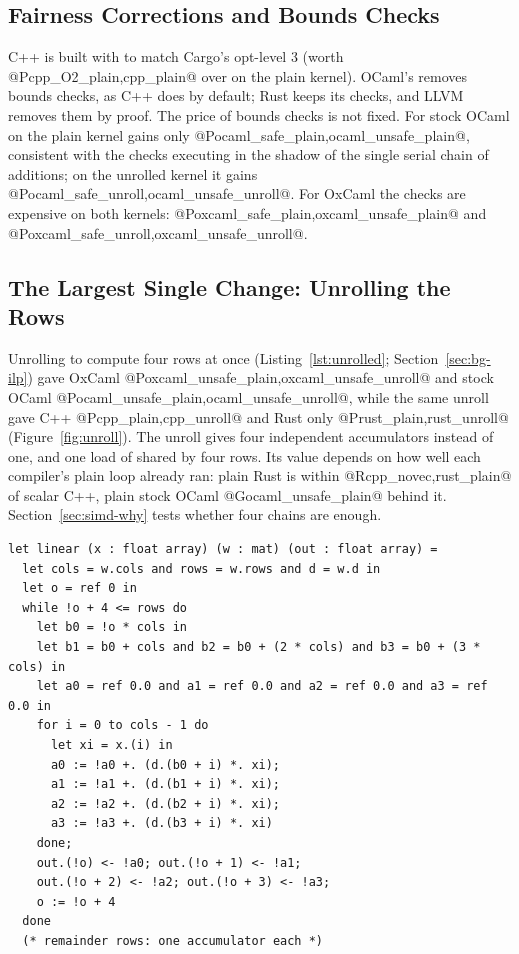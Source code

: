 \subsection{Fairness Corrections and Bounds Checks}
\label{tab:bounds}
C++ is built with  to match Cargo's opt-level 3 (worth
@P{cpp_O2_plain,cpp_plain}@ over  on the plain kernel). OCaml's
 removes bounds checks, as C++ does by default; Rust keeps its
checks, and LLVM removes them by proof. The price of bounds checks is not
fixed. For stock OCaml on the plain kernel  gains only
@P{ocaml_safe_plain,ocaml_unsafe_plain}@, consistent with the checks executing
in the shadow of the single serial chain of additions; on the unrolled kernel
it gains @P{ocaml_safe_unroll,ocaml_unsafe_unroll}@. For OxCaml the checks are
expensive on both kernels: @P{oxcaml_safe_plain,oxcaml_unsafe_plain}@ and
@P{oxcaml_safe_unroll,oxcaml_unsafe_unroll}@.

\subsection{The Largest Single Change: Unrolling the Rows}
\label{sec:unroll}
Unrolling  to compute four rows at once
(Listing~\ref{lst:unrolled}; Section~\ref{sec:bg-ilp}) gave OxCaml
@P{oxcaml_unsafe_plain,oxcaml_unsafe_unroll}@ and stock OCaml
@P{ocaml_unsafe_plain,ocaml_unsafe_unroll}@, while the same unroll gave C++
@P{cpp_plain,cpp_unroll}@ and Rust only @P{rust_plain,rust_unroll}@
(Figure~\ref{fig:unroll}). The unroll gives four independent accumulators
instead of one, and one load of  shared by four rows. Its value
depends on how well each compiler's plain loop already ran: plain Rust is
within @R{cpp_novec,rust_plain}@ of scalar C++, plain stock OCaml
@G{ocaml_unsafe_plain}@ behind it. Section~\ref{sec:simd-why} tests whether
four chains are enough.

\begin{lstlisting}[language=OCamlX,caption={The shipped OCaml kernel: four rows, four independent accumulators, each row summed left to right (C++ and Rust alike).},label=lst:unrolled]
let linear (x : float array) (w : mat) (out : float array) =
  let cols = w.cols and rows = w.rows and d = w.d in
  let o = ref 0 in
  while !o + 4 <= rows do
    let b0 = !o * cols in
    let b1 = b0 + cols and b2 = b0 + (2 * cols) and b3 = b0 + (3 * cols) in
    let a0 = ref 0.0 and a1 = ref 0.0 and a2 = ref 0.0 and a3 = ref 0.0 in
    for i = 0 to cols - 1 do
      let xi = x.(i) in
      a0 := !a0 +. (d.(b0 + i) *. xi);
      a1 := !a1 +. (d.(b1 + i) *. xi);
      a2 := !a2 +. (d.(b2 + i) *. xi);
      a3 := !a3 +. (d.(b3 + i) *. xi)
    done;
    out.(!o) <- !a0; out.(!o + 1) <- !a1;
    out.(!o + 2) <- !a2; out.(!o + 3) <- !a3;
    o := !o + 4
  done
  (* remainder rows: one accumulator each *)
\end{lstlisting}

